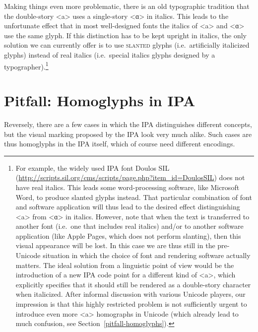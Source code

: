 Making things even more problematic, there is an old typographic tradition that
the double-story <a> uses a single-story <ɑ> in italics. This leads to the
unfortunate effect that in most well-designed fonts the italics of <a> and <ɑ>
use the same glyph. If this distinction has to be kept upright in italics, the
only solution we can currently offer is to use \textsc{slanted} glyphs
(i.e.~artificially italicized glyphs) instead of real italics (i.e.~special
italics glyphs designed by a typographer).\footnote{For example, the widely used
IPA font Doulos SIL
(\url{http://scripts.sil.org/cms/scripts/page.php?item\_id=DoulosSIL}) does not
have real italics. This leads some word-processing software, like Microsoft
Word, to produce slanted glyphs instead. That particular combination of font and
software application will thus lead to the desired effect distinguishing <a>
from <ɑ> in italics. However, note that when the text is transferred to another
font (i.e.~one that includes real italics) and/or to another software
application (like Apple Pages, which does not perform slanting), then this
visual appearance will be lost. In this case we are thus still in the
pre-Unicode situation in which the choice of font and rendering software
actually matters. The ideal solution from a linguistic point of view would be
the introduction of a new IPA code point for a different kind of <a>, which
explicitly specifies that it should still be rendered as a double-story
character when italicized. After informal discussion with various Unicode
players, our impression is that this highly restricted problem is not
sufficiently urgent to introduce even more <a> homographs in Unicode (which
already lead to much confusion, see Section~\ref{pitfall-homoglyphs}).}

\section{Pitfall: Homoglyphs in IPA}
\label{pitfall-homoglyphs-in-IPA}

Reversely, there are a few cases in which the IPA distinguishes different
concepts, but the visual marking proposed by the IPA look very much alike. Such
cases are thus homoglyphs in the IPA itself, which of course need different
encodings.

